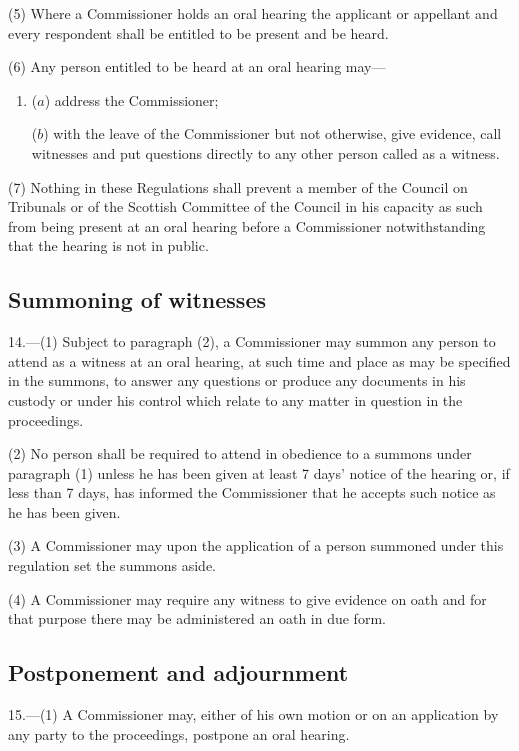 \documentclass[12pt,a4paper]{article}
\begin{document}
(5) Where a Commissioner holds an oral hearing the applicant or appellant and every respondent shall be entitled to be present and be heard.

(6) Any person entitled to be heard at an oral hearing may—
\begin{enumerate}\item[]
($a$) address the Commissioner;

($b$) with the leave of the Commissioner but not otherwise, give evidence, call witnesses and put questions directly to any other person called as a witness.
\end{enumerate}

(7) Nothing in these Regulations shall prevent a member of the Council on Tribunals or of the Scottish Committee of the Council in his capacity as such from being present at an oral hearing before a Commissioner notwithstanding that the hearing is not in public.

\subsection[14. Summoning of witnesses]{Summoning of witnesses}

14.—(1) Subject to paragraph (2), a Commissioner may summon any person to attend as a witness at an oral hearing, at such time and place as may be specified in the summons, to answer any questions or produce any documents in his custody or under his control which relate to any matter in question in the proceedings.

(2) No person shall be required to attend in obedience to a summons under paragraph (1) unless he has been given at least 7 days' notice of the hearing or, if less than 7 days, has informed the Commissioner that he accepts such notice as he has been given.

(3) A Commissioner may upon the application of a person summoned under this regulation set the summons aside.

(4) A Commissioner may require any witness to give evidence on oath and for that purpose there may be administered an oath in due form.

\subsection[15. Postponement and adjournment]{Postponement and adjournment}

15.—(1) A Commissioner may, either of his own motion or on an application by any party to the proceedings, postpone an oral hearing.
\end{document}
